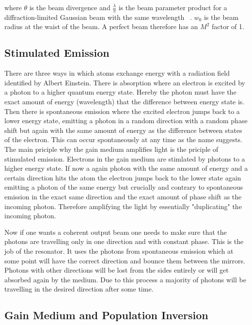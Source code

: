 \documentclass[a4paper,10pt]{article}
\begin{document}
    where $\theta$ is the beam divergence and $\frac{\lambda}{\pi}$ is
    the beam parameter product for a diffraction-limited Gaussian beam
    with the same wavelength ~\cite{m2_rpphotonics}.
    $w_0$ is the beam radius at the waist of the beam.
    A perfect beam therefore has an $M^2$ factor of 1.

    \subsection{Stimulated Emission}

    There are three ways in which atoms exchange energy with a radiation
    field~\cite{lasers_liverpool} identified by Albert Einstein.
    There is absorption where an electron is excited by a photon to a higher
    quantum energy state.
    Hereby the photon must have the exact amount of energy (wavelength)
    that the difference between energy state is.
    Then there is spontaneous emission where the excited electron jumps
    back to a lower energy state, emitting a photon in a random direction
    with a random phase shift
    but again with the same amount of energy as the difference between 
    states of the electron.
    This can occur spontaneously at any time as the name suggests. 
    The main priciple why the gain medium amplifies light is the priciple
    of stimulated emission.
    Electrons in the gain medium are stimlated by photons to a higher
    energy state.
    If now a again photon with the same amount of energy and a certain
    direction hits the atom the electron jumps back to the lower state
    again emitting a photon of the same energy but crucially and contrary
    to spontaneous emission in the exact same direction and the exact
    amount of phase shift as the incoming photon.
    Therefore amplifying the light by essentially "duplicating" the incoming
    photon.

    Now if one wants a coherent output beam one needs to make sure that
    the photons are travelling only in one direction and with constant
    phase.
    This is the job of the resonator.
    It uses the photons from spontaneous emission which at some point
    will have the correct direction and bounce them between the mirrors.
    Photons with other directions will be lost from the sides entirely
    or will get absorbed again by the medium.
    Due to this process a majority of photons will be travelling in the
    desired direction after some time.

    \subsection{Gain Medium and Population Inversion}
\end{document}
